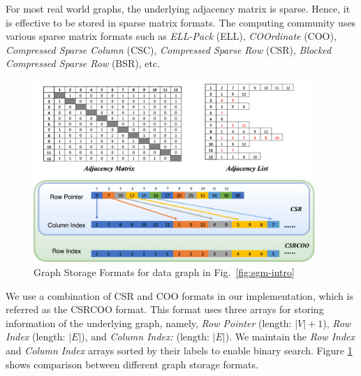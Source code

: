 For most real world graphs, the underlying adjacency matrix is sparse. Hence, it is effective to be stored in sparse matrix formats.
The computing community uses various sparse matrix formats such as \textit{ELL-Pack} (ELL), \textit{COOrdinate} (COO), \textit{Compressed Sparse Column} (CSC), \textit{Compressed Sparse Row} (CSR), \textit{Blocked Compressed Sparse Row} (BSR), etc.

\begin{figure}[h]
    \includegraphics[width=0.95\textwidth]{fig/LR/graph-storage.png}
    \caption{Graph Storage Formats for data graph in Fig.\ \ref{fig:sgm-intro}}
    \label{fig:graph-storage}
\end{figure}

We use a combination of CSR and COO formats in our implementation, which is referred as the CSRCOO format.
This format uses three arrays for storing information of the underlying graph, namely, \textit{Row Pointer} (length: $|V|+1$), \textit{Row Index} (length: $|E|$), and \textit{Column Index:} (length: $|E|$).
We maintain the \textit{Row Index} and \textit{Column Index} arrays sorted by their labels to enable binary search.
Figure \ref{fig:graph-storage} shows comparison between different graph storage formats.
